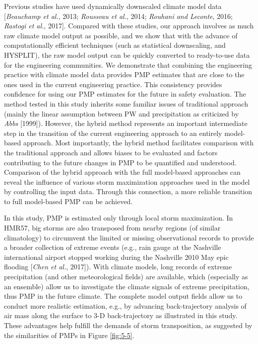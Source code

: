 Previous studies have used dynamically downscaled climate model data [\textit{Beauchamp et al.}, 2013; \textit{Rousseau et al.}, 2014; \textit{Rouhani and Leconte}, 2016; \textit{Rastogi et al.}, 2017]. Compared with these studies, our approach involves as much raw climate model output as possible, and we show that with the advance of computationally efficient techniques (such as statistical downscaling, and HYSPLIT), the raw model output can be quickly converted to ready-to-use data for the engineering communities. We demonstrate that combining the engineering practice with climate model data provides PMP estimates that are close to the ones used in the current engineering practice. This consistency provides confidence for using our PMP estimates for the future in safety evaluation. The method tested in this study inherits some familiar issues of traditional approach (mainly the linear assumption between PW and precipitation as criticized by \textit{Abbs} [1999]). However, the hybrid method represents an important intermediate step in the transition of the current engineering approach to an entirely model-based approach. Most importantly, the hybrid method facilitates comparison with the traditional approach and allows biases to be evaluated and factors contributing to the future changes in PMP to be quantified and understood. Comparison of the hybrid approach with the full model-based approaches can reveal the influence of various storm maximization approaches used in the model by controlling the input data. Through this connection, a more reliable transition to full model-based PMP can be achieved.

In this study, PMP is estimated only through local storm maximization. In HMR57, big storms are also transposed from nearby regions (of similar climatology) to circumvent the limited or missing observational records to provide a broader collection of extreme events (e.g., rain gauge at the Nashville international airport stopped working during the Nashville 2010 May epic flooding [\textit{Chen et al.}, 2017]). With climate models, long records of extreme precipitation (and other meteorological fields) are available, which (especially as an ensemble) allow us to investigate the climate signals of extreme precipitation, thus PMP in the future climate. The complete model output fields allow us to conduct more realistic estimation, e.g., by advancing back-trajectory analysis of air mass along the surface to 3-D back-trajectory as illustrated in this study. These advantages help fulfill the demands of storm transposition, as suggested by the similarities of PMPs in Figure \ref{fig:5-5}.

